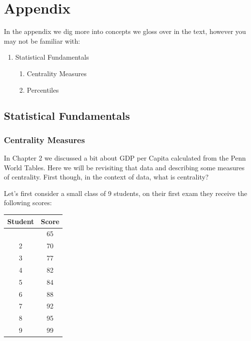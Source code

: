 \documentclass[
]{book}
\providecommand{\tightlist}{%
  \setlength{\itemsep}{0pt}\setlength{\parskip}{0pt}}
\begin{document}
\hypertarget{appendix}{%
\chapter{Appendix}\label{appendix}}

In the appendix we dig more into concepts we gloss over in the text, however you may not be familiar with:

\begin{enumerate}
\def\labelenumi{\arabic{enumi}.}
\tightlist
\item
  Statistical Fundamentals

  \begin{enumerate}
  \def\labelenumii{\alph{enumii}.}
  \tightlist
  \item
    Centrality Measures
  \item
    Percentiles
  \end{enumerate}
\end{enumerate}

\hypertarget{statistical-fundamentals}{%
\section{Statistical Fundamentals}\label{statistical-fundamentals}}

\hypertarget{centrality-measures}{%
\subsection{Centrality Measures}\label{centrality-measures}}

In Chapter 2 we discussed a bit about GDP per Capita calculated from the Penn World Tables. Here we will be revisiting that data and describing some measures of centrality. First though, in the context of data, what is centrality?

Let's first consider a small class of 9 students, on their first exam they receive the following scores:

\begin{longtable}[]{@{}cc@{}}
\toprule\noalign{}
Student & Score \\
\midrule\noalign{}
\endhead
\bottomrule\noalign{}
\endlastfoot
1 & 65 \\
2 & 70 \\
3 & 77 \\
4 & 82 \\
5 & 84 \\
6 & 88 \\
7 & 92 \\
8 & 95 \\
9 & 99 \\
\end{longtable}
\end{document}
